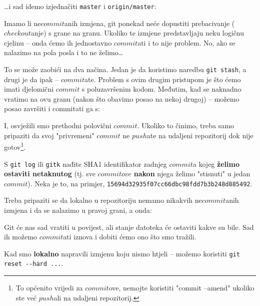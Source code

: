 
\dots{}i sad idemo izjednačiti \verb+master+ i \verb+origin/master+:



Imamo li ne$commit$anih izmjena, git ponekad neće dopustiti prebacivanje ($checkout$anje) s grane na granu.
Ukoliko te izmjene predstavljaju neku logičnu cjelinu -- onda ćemo ih jednostavno $commit$ati i to nije problem.
No, ako se nalazimo na pola posla i to ne želimo\dots

To se može zaobići na dva načina.
Jedan je da koristimo naredbu \verb+git stash+, a drugi je da ipak -- $commit$ate.
Problem s ovim drugim pristupom je što ćemo imati djelomični $commit$ s poluzavršenim kodom.  
Međutim, kad se naknadno vratimo na ovu granu (nakon što obavimo posao na nekoj drugoj) -- možemo posao završiti i commitati ga s:


I, osvježili smo prethodni polovični $commit$.
Ukoliko to činimo, treba samo pripaziti da svoj "privremeni" $commit$ ne $push$ate na udaljeni repozitorij dok nije gotov\footnote{To općenito vrijedi za $commit$ove, nemojte koristiti "commit --amend" ukoliko ste već $push$ali na udaljeni repozitorij.}.


S \verb+git log+ ili \verb+gitk+ nađite SHA1 identifikator zadnjeg $commit$a kojeg \textbf{želimo ostaviti netaknutog} (tj. sve $commitove$ \textbf{nakon} njega želimo "stisnuti" u jedan $commit$).
Neka je to, na primjer, \verb+15694d32935f07cc66dbc98fdd7b3b248d885492+.

Treba pripaziti se da lokalno u repozitoriju nemamo nikakvih ne$commit$anih izmjena i da se nalazimo u pravoj grani, a onda:


Git će nas sad vratiti u povijest, ali stanje datoteka će ostaviti kakve su bile.
Sad ih možemo $commit$ati iznova i dobiti ćemo ono što smo tražili.


Kad smo \textbf{lokalno} napravili izmjenu koju nismo htjeli -- možemo koristiti \verb+git reset --hard ...+.

